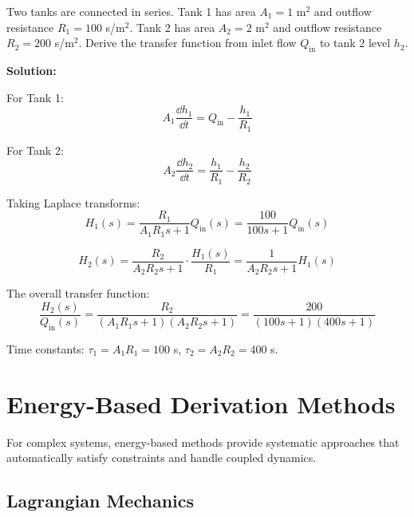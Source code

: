 \begin{examplebox}[title=Example 3.5: Two-Tank System]
Two tanks are connected in series. Tank 1 has area $A_1 = 1$ m$^2$ and outflow resistance $R_1 = 100$ s/m$^2$. Tank 2 has area $A_2 = 2$ m$^2$ and outflow resistance $R_2 = 200$ s/m$^2$. Derive the transfer function from inlet flow $Q_{\text{in}}$ to tank 2 level $h_2$.

\textbf{Solution:}

For Tank 1:
\begin{equation*}
A_1\frac{\dd h_1}{\dd t} = Q_{\text{in}} - \frac{h_1}{R_1}
\end{equation*}

For Tank 2:
\begin{equation*}
A_2\frac{\dd h_2}{\dd t} = \frac{h_1}{R_1} - \frac{h_2}{R_2}
\end{equation*}

Taking Laplace transforms:
\begin{equation*}
H_1(s) = \frac{R_1}{A_1 R_1 s + 1}Q_{\text{in}}(s) = \frac{100}{100s + 1}Q_{\text{in}}(s)
\end{equation*}

\begin{equation*}
H_2(s) = \frac{R_2}{A_2 R_2 s + 1} \cdot \frac{H_1(s)}{R_1} = \frac{1}{A_2 R_2 s + 1}H_1(s)
\end{equation*}

The overall transfer function:
\begin{equation*}
\frac{H_2(s)}{Q_{\text{in}}(s)} = \frac{R_2}{(A_1 R_1 s + 1)(A_2 R_2 s + 1)} = \frac{200}{(100s + 1)(400s + 1)}
\end{equation*}

Time constants: $\tau_1 = A_1 R_1 = 100$ s, $\tau_2 = A_2 R_2 = 400$ s.
\end{examplebox}

\section{Energy-Based Derivation Methods}
\label{sec:energy_methods}

For complex systems, energy-based methods provide systematic approaches that automatically satisfy constraints and handle coupled dynamics.

\subsection{Lagrangian Mechanics}

